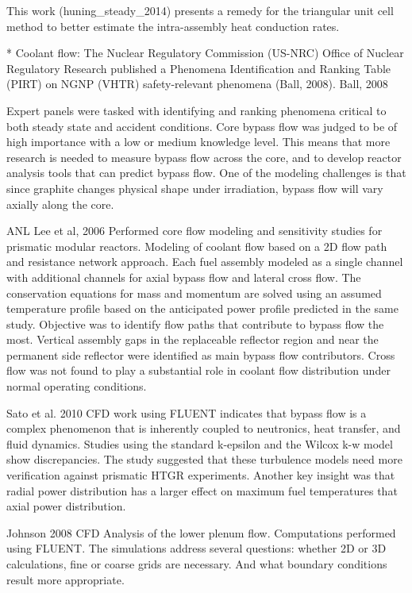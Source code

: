 This work (huning_steady_2014) presents a remedy for the triangular unit cell method to better estimate the intra-assembly heat conduction rates.

* Coolant flow:
The Nuclear Regulatory Commission (US-NRC) Office of Nuclear Regulatory Research published a Phenomena Identification and Ranking Table (PIRT) on NGNP (VHTR) safety-relevant phenomena (Ball, 2008).
Ball, 2008 %

Expert panels were tasked with identifying and ranking phenomena critical to both steady state and accident conditions.
Core bypass flow was judged to be of high importance with a low or medium knowledge level.
This means that more research is needed to measure bypass flow across the core, and to develop reactor analysis tools that can predict bypass flow.
One of the modeling challenges is that since graphite changes physical shape under irradiation, bypass flow will vary axially along the core.

ANL
Lee et al, 2006 %
Performed core flow modeling and sensitivity studies for prismatic modular reactors.
Modeling of coolant flow based on a 2D flow path and resistance network approach.
Each fuel assembly modeled as a single channel with additional channels for axial bypass flow and lateral cross flow.
The conservation equations for mass and momentum are solved using an assumed temperature profile based on the anticipated power profile predicted in the same study.
Objective was to identify flow paths that contribute to bypass flow the most.
Vertical assembly gaps in the replaceable reflector region and near the permanent side reflector were identified as main bypass flow contributors.
Cross flow was not found to play a substantial role in coolant flow distribution under normal operating conditions.

Sato et al. 2010 %
CFD work using FLUENT indicates that bypass flow is a complex phenomenon that is inherently coupled to neutronics, heat transfer, and fluid dynamics.
Studies using the standard k-epsilon and the Wilcox k-w model show discrepancies.
The study suggested that these turbulence models need more verification against prismatic HTGR experiments.
Another key insight was that radial power distribution has a larger effect on maximum fuel temperatures that axial power distribution.

Johnson 2008 %
CFD Analysis of the lower plenum flow.
Computations performed using FLUENT.
The simulations address several questions: whether 2D or 3D calculations, fine or coarse grids are necessary. And what boundary conditions result more appropriate.

